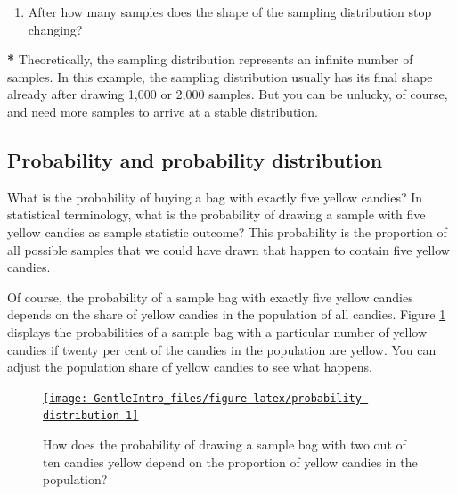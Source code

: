 \documentclass[a4paper]{book}
\newenvironment{Shaded}{\begin{snugshade}}{\end{snugshade}}
\newcommand{\DecValTok}[1]{\textcolor[rgb]{0.00,0.00,0.00}{#1}}
\newcommand{\StringTok}[1]{\textcolor[rgb]{0.00,0.00,0.00}{#1}}
\newcommand{\OperatorTok}[1]{\textcolor[rgb]{0.00,0.00,0.00}{\textbf{#1}}}
\newcommand{\NormalTok}[1]{#1}
\providecommand{\tightlist}{%
  \setlength{\itemsep}{0pt}\setlength{\parskip}{0pt}}
\theoremstyle{definition}
\theoremstyle{definition}
\theoremstyle{definition}
\theoremstyle{remark}
\begin{document}
\begin{enumerate}
\def\labelenumi{\arabic{enumi}.}
\setcounter{enumi}{3}
\tightlist
\item
  After how many samples does the shape of the sampling distribution
  stop changing?
\end{enumerate}

\begin{Shaded}
\begin{Highlighting}[]
\OperatorTok{*}\StringTok{ }\NormalTok{Theoretically, the sampling distribution represents an infinite number of}
\NormalTok{samples. In this example, the sampling distribution usually has its final}
\NormalTok{shape already after drawing }\DecValTok{1}\NormalTok{,}\DecValTok{000}\NormalTok{ or }\DecValTok{2}\NormalTok{,}\DecValTok{000}\NormalTok{ samples. But you can be unlucky, of}
\NormalTok{course, and need more samples to arrive at a stable distribution.}
\end{Highlighting}
\end{Shaded}

\subsection{Probability and probability
distribution}\label{probdistribution}

What is the probability of buying a bag with exactly five yellow
candies? In statistical terminology, what is the probability of drawing
a sample with five yellow candies as sample statistic outcome? This
probability is the proportion of all possible samples that we could have
drawn that happen to contain five yellow candies.

Of course, the probability of a sample bag with exactly five yellow
candies depends on the share of yellow candies in the population of all
candies. Figure \ref{fig:probability-distribution} displays the
probabilities of a sample bag with a particular number of yellow candies
if twenty per cent of the candies in the population are yellow. You can
adjust the population share of yellow candies to see what happens.

\begin{figure}[H]
\href{http://82.196.4.233:3838/apps/probability-distribution/}{\texttt{[image: GentleIntro\_files/figure-latex/probability-distribution-1]} }\caption{How does the probability of drawing a sample bag with two out of ten candies yellow depend on the proportion of yellow candies in the population?}\label{fig:probability-distribution}
\end{figure}
\end{document}
